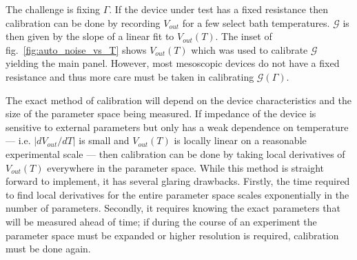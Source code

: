 The challenge is fixing $\Gamma$. If the device under test has a fixed resistance then calibration can be done by recording $V_{out}$ for a few select bath temperatures. $\mathcal{G}$ is then given by the slope of a linear fit to $V_{out}(T)$. The inset of fig.~\ref{fig:auto_noise_vs_T} shows $V_{out}(T)$ which was used to calibrate $\mathcal{G}$ yielding the main panel. However, most mesoscopic devices do not have a fixed resistance and thus more care must be taken in calibrating $\mathcal{G}(\Gamma)$.

The exact method of calibration will depend on the device characteristics and the size of the parameter space being measured. If impedance of the device is sensitive to external parameters but only has a weak dependence on temperature --- i.e. $|dV_{out}/dT|$ is small and $V_{out}(T)$ is locally linear on a reasonable experimental scale --- then calibration can be done by taking local derivatives of $V_{out}(T)$ everywhere in the parameter space. While this method is straight forward to implement, it has several glaring drawbacks. Firstly, the time required to find local derivatives for the entire parameter space scales exponentially in the number of parameters. Secondly, it requires knowing the exact parameters that will be measured ahead of time; if during the course of an experiment the parameter space must be expanded or higher resolution is required, calibration must be done again.

